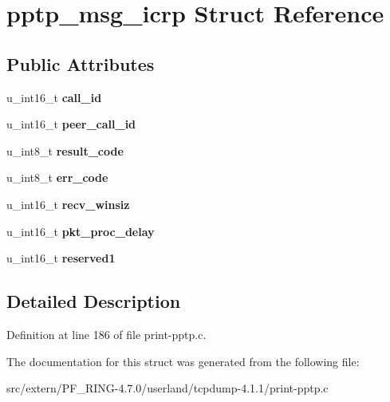 \hypertarget{structpptp__msg__icrp}{
\section{pptp\_\-msg\_\-icrp Struct Reference}
\label{structpptp__msg__icrp}
}
\subsection*{Public Attributes}
\begin{DoxyCompactItemize}
\item 
\hypertarget{structpptp__msg__icrp_a171e5fa61003c1effddde8504b8d5ae8}{
u\_\-int16\_\-t {\bfseries call\_\-id}}
\label{structpptp__msg__icrp_a171e5fa61003c1effddde8504b8d5ae8}

\item 
\hypertarget{structpptp__msg__icrp_a09af30b0e6cf0a014f3a7d374d0bd5ea}{
u\_\-int16\_\-t {\bfseries peer\_\-call\_\-id}}
\label{structpptp__msg__icrp_a09af30b0e6cf0a014f3a7d374d0bd5ea}

\item 
\hypertarget{structpptp__msg__icrp_a41535c6a22099c30f8dd1c3293861b9b}{
u\_\-int8\_\-t {\bfseries result\_\-code}}
\label{structpptp__msg__icrp_a41535c6a22099c30f8dd1c3293861b9b}

\item 
\hypertarget{structpptp__msg__icrp_a18f29c56a452709c300099a9da78b966}{
u\_\-int8\_\-t {\bfseries err\_\-code}}
\label{structpptp__msg__icrp_a18f29c56a452709c300099a9da78b966}

\item 
\hypertarget{structpptp__msg__icrp_a1fd79c8807eda1911bec344af199f0fa}{
u\_\-int16\_\-t {\bfseries recv\_\-winsiz}}
\label{structpptp__msg__icrp_a1fd79c8807eda1911bec344af199f0fa}

\item 
\hypertarget{structpptp__msg__icrp_a15661f2616f700c3ec857d761480757d}{
u\_\-int16\_\-t {\bfseries pkt\_\-proc\_\-delay}}
\label{structpptp__msg__icrp_a15661f2616f700c3ec857d761480757d}

\item 
\hypertarget{structpptp__msg__icrp_ae1493d3acf75559efa18af7c466bb5d3}{
u\_\-int16\_\-t {\bfseries reserved1}}
\label{structpptp__msg__icrp_ae1493d3acf75559efa18af7c466bb5d3}

\end{DoxyCompactItemize}


\subsection{Detailed Description}


Definition at line 186 of file print-\/pptp.c.



The documentation for this struct was generated from the following file:\begin{DoxyCompactItemize}
\item 
src/extern/PF\_\-RING-\/4.7.0/userland/tcpdump-\/4.1.1/print-\/pptp.c\end{DoxyCompactItemize}
